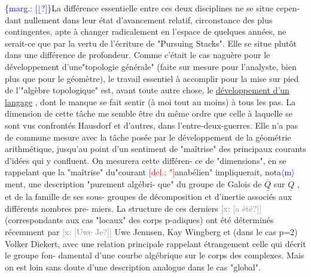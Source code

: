 \documentclass[11pt]{article}
\newcommand{\mspage}[1]{{\small\sffamily[p.\,#1]}}
\newcommand{\hand}[1]{\textcolor{blue}{#1}}
\newcommand{\inserted}[2][]{\textcolor{blue}{$\langle$#2$\rangle$}}
\newcommand{\margin}[1]{\textcolor{blue}{\{\textsf{marg.:} #1\}}}
\newcommand{\deleted}[1]{\textcolor{red}{[\textsf{del.:} #1]}}
\newcommand{\xout}[1]{\textcolor{gray}{[\textsf{x:} #1]}}
\newcommand{\uline}[1]{\underline{#1}}
\newcommand{\unsure}[1]{[#1?]}
\begin{document}
\margin{\unsure{$\lfloor$}}La différence essentielle entre ces deux disciplines ne se situe cepen-%
dant nullement dans leur état d'avancement relatif, circonstance des
plus contingentes\hand{,} apte à changer radicalement en l'espace de quelques
années, ne serait-ce que par la vertu de l'écriture de "Pursuing Stacks"\hand{.}
Elle se situe plutôt dans une différence de profondeur. Comme c'était
le cas naguère pour le développement d'une"topologie générale" (faite
sur mesure pour l'analyste, bien plus que pour le géomètre), le travail
essentiel à accomplir pour la mise sur pied de l'"algèbre topologique"
est\hand{,} avant toute autre chose, le \uline{développement d'un langage} , dont le
manque se fait sentir (à moi tout au moins) à tous les pas. La dimension
de cette tâche me semble être du même ordre que celle à laquelle se sont
vu\hand{s} confronté\hand{s} Hausdorf et d'autres, dans l'entre-deux-guerres. Elle n'a
pas de commune mesure avec la tâche posée par le développement de la
géométrie arithmétique, jusqu'au point d'un sentiment de "maîtrise" des
principaux courants d'idées qui y confluent. On mesurera cette différen-%
ce de "dimensions", en se rappelant que la "maîtrise" du\hand{"}courant
\deleted{"}anabélien" impliquerait, nota\inserted{m}ment, une description "purement algébri-%
que" du groupe de Galois de $\overline{\underline{Q}}$ sur $\underline{Q}$ , et de la famille de ses sous-%
groupes de décomposition et d'inertie associés aux différents nombres pre-%
miers. La structure de ces derniers \xout{\unsure{a été}} (correspondants aux cas
"locaux" des corps p-adiques) ont été déterminés récemment par \xout{\unsure{Uwe Je}}
Uwe Jennsen, Kay Wingberg et (dans le cas p=2) Volker Diekert, avec une
relation principale rappelant étrangement celle qui décrit le groupe fon-%
damental d'une courbe algébrique sur le corps des complexes. Mais on est
loin sans doute d'une description analogue dans le cas "global".

\mspage{138}
\end{document}
